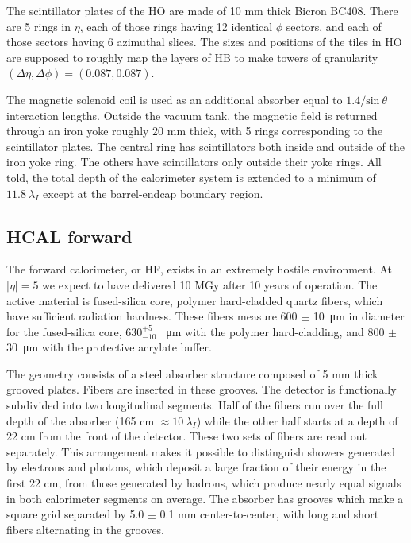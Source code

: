 The scintillator plates of the HO are made of 10 mm thick Bicron BC408. There are 5 rings in $\eta$, each of those rings having 12 identical $\phi$ sectors, and each of those sectors having 6 azimuthal slices.
The sizes and positions of the tiles in HO are supposed to roughly map the layers of HB
to make towers of granularity $(\Delta\eta, \Delta\phi) = (0.087, 0.087)$.

The magnetic solenoid coil is used as an additional absorber equal to $1.4/\textrm{sin}\:\theta$ interaction lengths.
Outside the vacuum tank, the magnetic field is returned through an iron yoke roughly 20 mm thick, with 5 rings corresponding to the scintillator plates.
The central ring has scintillators both inside and outside of the iron yoke ring.
The others have scintillators only outside their yoke rings.
All told, the total depth of the calorimeter system is extended to a minimum of
$11.8\:\lambda_I$ except at the barrel-endcap boundary region.

\subsection{HCAL forward}
The forward calorimeter, or HF, exists in an extremely hostile environment. 
At $|\eta|=5$ we expect to have delivered 10 MGy after 10 years of operation.
The active material is fused-silica core, polymer hard-cladded quartz fibers, which have sufficient radiation hardness.
These fibers measure 600 $\pm$ \SI{10}{\micro\meter} in diameter for the fused-silica core,
$ {630}^{+5}_{-10}$ \SI{}{\micro\meter} with the polymer hard-cladding, 
and 800 $\pm$ \SI{30}{\micro\meter} with the protective acrylate buffer.

The geometry consists of a steel absorber structure composed of 5 mm thick grooved
plates. Fibers are inserted in these grooves.
The detector is functionally subdivided into two longitudinal segments. 
Half of the fibers run over the full depth of the absorber (165 cm $\approx 10\:\lambda_I$)
while the other half starts at a depth of 22 cm from the front of the detector.
These two sets of fibers are read out separately. 
This arrangement makes it possible to distinguish showers generated by electrons and photons,
which deposit a large fraction of their energy in the first 22 cm,
from those generated by hadrons, which produce nearly equal signals in both calorimeter segments on average. 
The absorber has grooves which make a square grid separated by 5.0 $\pm$ 0.1 mm center-to-center, with long and short fibers alternating in the grooves. 

